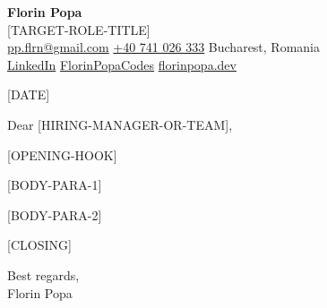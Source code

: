 \documentclass[a4paper, 11pt]{article}
\newcommand{\sep}{\enspace\textperiodcentered\enspace}
\begin{document}
\begin{center}
  {\LARGE \textbf{Florin Popa}}\\[0.4em]
  {\textcolor{light}{[TARGET-ROLE-TITLE]}}\\[0.4em]
  \href{mailto:pp.flrn@gmail.com}{pp.flrn@gmail.com}
  \sep
  \href{tel:+40741026333}{+40 741 026 333}
  \sep
  Bucharest, Romania\\[0.4em]
  \href{https://www.linkedin.com/in/florin-popa-08405566/}{LinkedIn}
  \sep
  \href{https://github.com/FlorinPopaCodes}{FlorinPopaCodes}
  \sep
  \href{https://florinpopa.dev}{florinpopa.dev}
\end{center}

\vspace{1.5em}

[DATE]

\vspace{0.5em}

Dear [HIRING-MANAGER-OR-TEAM],

[OPENING-HOOK]

[BODY-PARA-1]

[BODY-PARA-2]

[CLOSING]

Best regards,\\
Florin Popa
\end{document}
